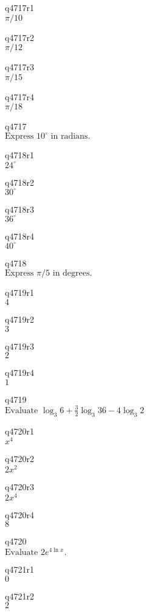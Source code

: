 q4717r1\\
\(\displaystyle \pi/10 \)

q4717r2\\
\(\displaystyle \pi/12 \)

q4717r3\\
\(\displaystyle \pi/15 \)

q4717r4\\
\(\displaystyle \pi/18 \)

q4717\\
\(\displaystyle \text{Express } 10^{\circ} \text{ in radians.} \)

q4718r1\\
\(\displaystyle 24^{\circ} \)

q4718r2\\
\(\displaystyle 30^{\circ} \)

q4718r3\\
\(\displaystyle 36^{\circ} \)

q4718r4\\
\(\displaystyle 40^{\circ} \)

q4718\\
\(\displaystyle \text{Express } \pi/5 \text{ in degrees.} \)

q4719r1\\
\(\displaystyle 4 \)

q4719r2\\
\(\displaystyle 3 \)

q4719r3\\
\(\displaystyle 2 \)

q4719r4\\
\(\displaystyle 1 \)

q4719\\
\(\displaystyle \text{Evaluate } \log_3 6 + \frac{3}{2} \log_3 36 - 4\log_3 2 \)

q4720r1\\
\(\displaystyle x^4 \)

q4720r2\\
\(\displaystyle 2x^2 \)

q4720r3\\
\(\displaystyle 2x^4 \)

q4720r4\\
\(\displaystyle 8 \)

q4720\\
\(\displaystyle \text{Evaluate } 2e^{4\ln x}. \)

q4721r1\\
\(\displaystyle 0 \)

q4721r2\\
\(\displaystyle 2 \)

